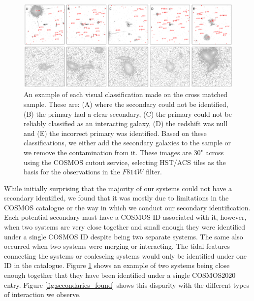 \begin{figure}
    \centering
    \includegraphics[width=\textwidth]{Chapter3/figures/cutouts_ex.pdf}
    \caption[An example of each visual classification made on the cross matched sample.]{An example of each visual classification made on the cross matched sample. These are: (A) where the secondary could not be identified, (B) the primary had a clear secondary, (C) the primary could not be reliably classified as an interacting galaxy, (D) the redshift was null and (E) the incorrect primary was identified. Based on these classifications, we either add the secondary galaxies to the sample or we remove the contamination from it. These images are 30" across using the COSMOS cutout service, selecting HST/ACS tiles as the basis for the observations in the $F814W$ filter.}
    \label{fig:secondary_selection}
\end{figure}

While initially surprising that the majority of our systems could not have a secondary identified, we found that it was mostly due to limitations in the COSMOS catalogue or the way in which we conduct our secondary identification. Each potential secondary must have a COSMOS ID associated with it, however, when two systems are very close together and small enough they were identified under a single COSMOS ID despite being two separate systems. The same also occurred when two systems were merging or interacting. The tidal features connecting the systems or coalescing systems would only be identified under one ID in the catalogue. Figure \ref{fig:secondary_selection} shows an example of two systems being close enough together that they have been identified under a single COSMOS2020 entry. Figure \ref{fig:secondaries_found} shows this disparity with the different types of interaction we observe.

